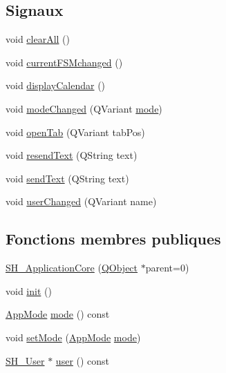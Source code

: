 \subsection*{Signaux}
\begin{DoxyCompactItemize}
\item 
void \hyperlink{classSH__ApplicationCore_a5f60ca485028cf56d9d56f7e80685f10}{clear\-All} ()
\item 
void \hyperlink{classSH__ApplicationCore_a624c1b864a82d2004c9bc61910eb2550}{current\-F\-S\-Mchanged} ()
\item 
void \hyperlink{classSH__ApplicationCore_a7236456c901a089ca6e5735ec7e5da03}{display\-Calendar} ()
\item 
void \hyperlink{classSH__ApplicationCore_adad0e1b383ce90a698cb5dd49a88ab79}{mode\-Changed} (Q\-Variant \hyperlink{classSH__ApplicationCore_a210295d4d7a6e16e9def6e0a29816b51}{mode})
\item 
void \hyperlink{classSH__ApplicationCore_ad5ac1ec920c48222b6643788706461e1}{open\-Tab} (Q\-Variant tab\-Pos)
\item 
void \hyperlink{classSH__ApplicationCore_a5eb6c04758ff47330a8249da2b3265f2}{resend\-Text} (Q\-String text)
\item 
void \hyperlink{classSH__ApplicationCore_ac70121669e6133e84b0b8266b09b9199}{send\-Text} (Q\-String text)
\item 
void \hyperlink{classSH__ApplicationCore_af0c5c92e7b410b226c3497cec2ddfd97}{user\-Changed} (Q\-Variant name)
\end{DoxyCompactItemize}
\subsection*{Fonctions membres publiques}
\begin{DoxyCompactItemize}
\item 
\hyperlink{classSH__ApplicationCore_a3c33fe8a39bd571c4c809d8c55603156}{S\-H\-\_\-\-Application\-Core} (\hyperlink{classQObject}{Q\-Object} $\ast$parent=0)
\item 
void \hyperlink{classSH__ApplicationCore_ab50397fef5fa4a514e0a1a0443b886ce}{init} ()
\item 
\hyperlink{classSH__ApplicationCore_a6b93b2f83a290305f282616eb2935899}{App\-Mode} \hyperlink{classSH__ApplicationCore_a210295d4d7a6e16e9def6e0a29816b51}{mode} () const 
\item 
void \hyperlink{classSH__ApplicationCore_aeb87d289ccc9c8209928f23cf8a02ead}{set\-Mode} (\hyperlink{classSH__ApplicationCore_a6b93b2f83a290305f282616eb2935899}{App\-Mode} \hyperlink{classSH__ApplicationCore_a210295d4d7a6e16e9def6e0a29816b51}{mode})
\item 
\hyperlink{classSH__User}{S\-H\-\_\-\-User} $\ast$ \hyperlink{classSH__ApplicationCore_aa154f69097fb07514b300f9c8f189da9}{user} () const 
\end{DoxyCompactItemize}
